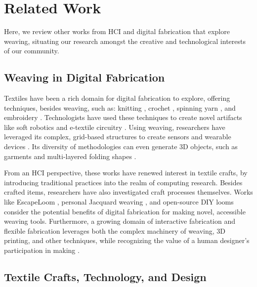 \section{Related Work}
\label{sect_related-work}

Here, we review other works from HCI and digital fabrication that explore weaving, situating our research amongst the creative and technological interests of our community. 

\subsection{Weaving in Digital Fabrication}

Textiles have been a rich domain for digital fabrication to explore, offering techniques, besides weaving, such as: knitting \cite{mccann_compiler_2016}, crochet \cite{okazaki_metamocrochet_2014}, spinning yarn \cite{rivera_desktop_2019, studio_hilo_open_nodate}, and embroidery \cite{jo_skinlace_2021}. Technologists have used these techniques to create novel artifacts like soft robotics \cite{luo_knitui_2021} and e-textile circuitry \cite{posch_crafting_2017}. Using weaving, researchers have leveraged its complex, grid-based structures to create sensors \cite{pouta_woven_2022, devendorf_introduction_2022} and wearable devices \cite{huang_wovenprobe_2021, sun_style-woven_2022}. Its diversity of methodologies can even generate 3D objects, such as garments \cite{mcquillan_hybrid_2019} and multi-layered folding shapes \cite{richards_weaving_2012, mayer_clothing_1984}.

From an HCI perspective, these works have renewed interest in textile crafts, by introducing traditional practices into the realm of computing research. Besides crafted items, researchers have also investigated craft processes themselves. Works like EscapeLoom \cite{deshpande_escapeloom_2021}, personal Jacquard weaving \cite{albaugh_enabling_2021}, and open-source DIY looms \cite{noauthor_frame_2017} consider the potential benefits of digital fabrication for making novel, accessible weaving tools. Furthermore, a growing domain of interactive fabrication and flexible fabrication leverages both the complex machinery of weaving, 3D printing, and other techniques, while recognizing the value of a human designer’s participation in making \cite{albaugh_investigating_2020, gifford_systems_2015, kim_compositional_2018, sun_flextruss_2021}.

\subsection{Textile Crafts, Technology, and Design}

